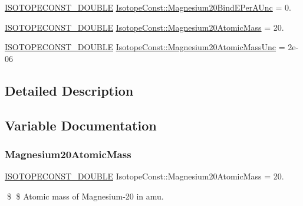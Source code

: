 \begin{DoxyCompactItemize}
\mbox{\hyperlink{group___isotope_const-_macros_ga8f45a7272ce02c0b4c65c44636ed719a}{I\+S\+O\+T\+O\+P\+E\+C\+O\+N\+S\+T\+\_\+\+D\+O\+U\+B\+LE}} \mbox{\hyperlink{group___isotope_const-_magnesium-_mg20_gad55f5ea6eb866fc5c9526ff25212ea0f}{Isotope\+Const\+::\+Magnesium20\+Bind\+E\+Per\+A\+Unc}} = 0.
\item 
\mbox{\hyperlink{group___isotope_const-_macros_ga8f45a7272ce02c0b4c65c44636ed719a}{I\+S\+O\+T\+O\+P\+E\+C\+O\+N\+S\+T\+\_\+\+D\+O\+U\+B\+LE}} \mbox{\hyperlink{group___isotope_const-_magnesium-_mg20_gaf59cebf352d6f318e1ef8b8ceb079915}{Isotope\+Const\+::\+Magnesium20\+Atomic\+Mass}} = 20.
\item 
\mbox{\hyperlink{group___isotope_const-_macros_ga8f45a7272ce02c0b4c65c44636ed719a}{I\+S\+O\+T\+O\+P\+E\+C\+O\+N\+S\+T\+\_\+\+D\+O\+U\+B\+LE}} \mbox{\hyperlink{group___isotope_const-_magnesium-_mg20_gab31c051348faaf3000103370b24d1f42}{Isotope\+Const\+::\+Magnesium20\+Atomic\+Mass\+Unc}} = 2e-\/06
\end{DoxyCompactItemize}


\subsection{Detailed Description}


\subsection{Variable Documentation}
\mbox{\label{group___isotope_const-_magnesium-_mg20_gaf59cebf352d6f318e1ef8b8ceb079915}} 
\subsubsection{\texorpdfstring{Magnesium20\+Atomic\+Mass}{Magnesium20AtomicMass}}
{\footnotesize\ttfamily \mbox{\hyperlink{group___isotope_const-_macros_ga8f45a7272ce02c0b4c65c44636ed719a}{I\+S\+O\+T\+O\+P\+E\+C\+O\+N\+S\+T\+\_\+\+D\+O\+U\+B\+LE}} Isotope\+Const\+::\+Magnesium20\+Atomic\+Mass = 20.}

\$ \$ Atomic mass of Magnesium-\/20 in amu. \mbox{\label{group___isotope_const-_magnesium-_mg20_gab31c051348faaf3000103370b24d1f42}} 
